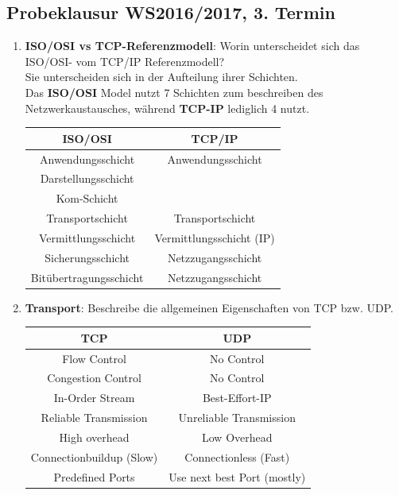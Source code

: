\documentclass{article}
\begin{document}
    \subsection{Probeklausur WS2016/2017, 3. Termin}
    \begin{enumerate}
        \item \textbf{ISO/OSI vs TCP-Referenzmodell}: Worin unterscheidet sich das ISO/OSI- vom TCP/IP Referenzmodell?\\
        Sie unterscheiden sich in der Aufteilung ihrer Schichten.\\
        Das \textbf{ISO/OSI} Model nutzt 7 Schichten zum beschreiben des Netzwerkaustausches, während \textbf{TCP-IP} lediglich 4 nutzt.
        \begin{center}
            \begin{tabular}{c|c}
                \textbf{ISO/OSI}        & \textbf{TCP/IP}  \\\hline
                Anwendungsschicht       & Anwendungsschicht\\
                Darstellungsschicht     & \\
                Kom-Schicht             & \\
                Transportschicht        & Transportschicht\\
                Vermittlungsschicht     & Vermittlungsschicht (IP)\\
                Sicherungsschicht       & Netzzugangsschicht\\
                Bitübertragungsschicht  & Netzzugangsschicht\\
            \end{tabular}
        \end{center}
        
        \item \textbf{Transport}: Beschreibe die allgemeinen Eigenschaften von TCP bzw. UDP.\\
        
        \begin{center}
            \begin{tabular}{c|c}
                \textbf{TCP} & \textbf{UDP}                         \\\hline
                Flow Control            & No Control                \\
                Congestion Control      & No Control                \\
                In-Order Stream         & Best-Effort-IP            \\
                Reliable Transmission   & Unreliable Transmission   \\
                High overhead           & Low Overhead              \\
                Connectionbuildup (Slow)& Connectionless (Fast)     \\
                Predefined Ports        & Use next best Port (mostly)\\
            \end{tabular}
        \end{center}
        

\end{enumerate}
\end{document}
